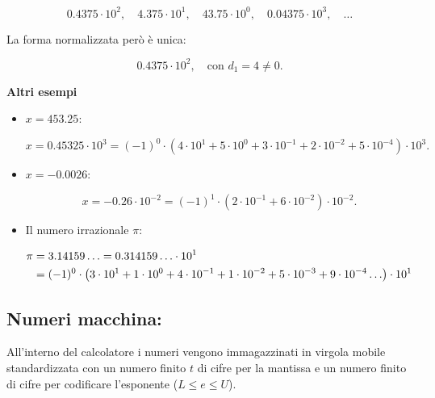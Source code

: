 \documentclass[a4paper, 11pt]{article}
\begin{document}
            \[
            0.4375 \cdot 10^2, \quad 4.375 \cdot 10^1, \quad 43.75 \cdot 10^0, \quad 0.04375 \cdot 10^3, \quad \dots
            \]



            La forma normalizzata però è unica:


            \[
            0.4375 \cdot 10^2, \quad \text{con } d_1 = 4 \neq 0.
            \]



            \textbf{Altri esempi}

            \begin{itemize}
                \item \(x = 453.25\):
                

            \[
                x = 0.45325 \cdot 10^3 = (-1)^0 \cdot \left(4 \cdot 10^1 + 5 \cdot 10^0 + 3 \cdot 10^{-1} + 2 \cdot 10^{-2} + 5 \cdot 10^{-4}\right) \cdot 10^3.
            \]



                \item \(x = -0.0026\):
                

            \[
                x = -0.26 \cdot 10^{-2} = (-1)^1 \cdot \left(2 \cdot 10^{-1} + 6 \cdot 10^{-2}\right) \cdot 10^{-2}.
            \]



                \item Il numero irrazionale \(\pi\):
                
            

            \begin{align}
                \pi &= 3.14159 \ldots = 0.314159 \ldots \cdot 10^1 \notag \\
                &= (-1)^0 \cdot \left(3 \cdot 10^1 + 1 \cdot 10^0 + 4 \cdot 10^{-1} + 1 \cdot 10^{-2} + 5 \cdot 10^{-3} + 9 \cdot 10^{-4} \ldots\right) \cdot 10^1 \notag
            \end{align}
                

            \end{itemize}



        \subsection{Numeri macchina: }

            All'interno del calcolatore i numeri vengono immagazzinati in virgola mobile standardizzata con un numero finito $t$ di cifre per la mantissa e un numero finito di cifre per codificare l'esponente ($L \leq e \leq U$).
\end{document}
